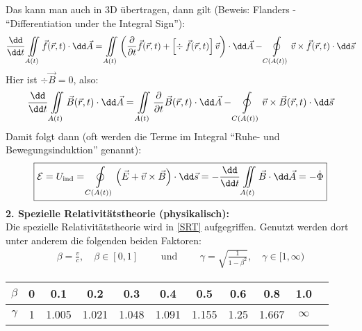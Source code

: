 			  Das kann man auch in 3D übertragen, dann gilt (Beweis: Flanders - \enquote{Differentiation under the Integral Sign}):
			        \begin{equation}\begin{split}
					        \frac{\dd}{\dd t}  \iint\limits_{A(t)} \vec{f} (\vec{r} , t) \cdot \dd\vec{A} = \iint\limits_{A(t)} \left( \frac{\partial}{\partial t}\vec{f}(\vec{r} , t) + \left[ \div \; \vec{f}(\vec{r} , t) \right] \vec{v} \right) \cdot \dd\vec{A} - \oint\displaylimits_{C(A(t))}
					        \vec{v} \times  \vec{f}(\vec{r} , t) \cdot \dd\vec{s}   \end{split}\end{equation}
			 Hier ist \(\div \vec{B} =0\), also:
			        \begin{equation}\begin{split}
					        \frac{\dd}{\dd t}  \iint\limits_{A(t)} \vec{B}  (\vec{r} , t) \cdot \dd\vec{A} = \iint\limits_{A(t)} \frac{\partial}{\partial t}\vec{B} (\vec{r} , t) \cdot \dd\vec{A} - \oint\displaylimits_{C(A(t))}
					        \vec{v} \times \vec{B} (\vec{r} , t) \cdot \dd\vec{s}   \end{split}\end{equation}
			  Damit folgt dann (oft werden die Terme im Integral \enquote{Ruhe- und Bewegungsinduktion} genannt):
			        \begin{equation}\begin{split}
					        \boxed{\mathcal{E}=U_\text{ind} = \oint\displaylimits_{C(A(t))} \left( \vec{E} + \vec{v} \times \vec{B} \right) \cdot\dd\vec{s} = - \frac{\dd}{\dd t}  \iint\limits_{A(t)} \vec{B}  \cdot \dd\vec{A}  = -\dot{\Phi}}
				        \end{split}\end{equation}
	  \textbf{2. Spezielle Relativitätstheorie (physikalisch):}\\
			  Die spezielle Relativitätstheorie wird in \ref{SRT} aufgegriffen. Genutzt werden dort unter anderem die folgenden beiden Faktoren:
			        \begin{equation}\begin{split}
					        \beta = \frac{v}{c},\quad \beta \in [0, 1]\quad\quad \text{ und }\quad\quad \gamma = \sqrt{\frac{1}{1-\beta^2}},\quad \gamma \in [1,\infty)
				        \end{split}\end{equation}
			        \begin{center}
			        \begin{tabular}{c||c|c|c|c|c|c |c|c|c|c}
				        $\beta$  & 0 & 0.1   & 0.2   & 0.3   & 0.4   & 0.5   & 0.6  & 0.8   & 1.0      \\
				        \hline
				        $\gamma$ & 1 & 1.005 & 1.021 & 1.048 & 1.091 & 1.155 & 1.25 & 1.667 & $\infty$
			        \end{tabular}
			        \end{center}
